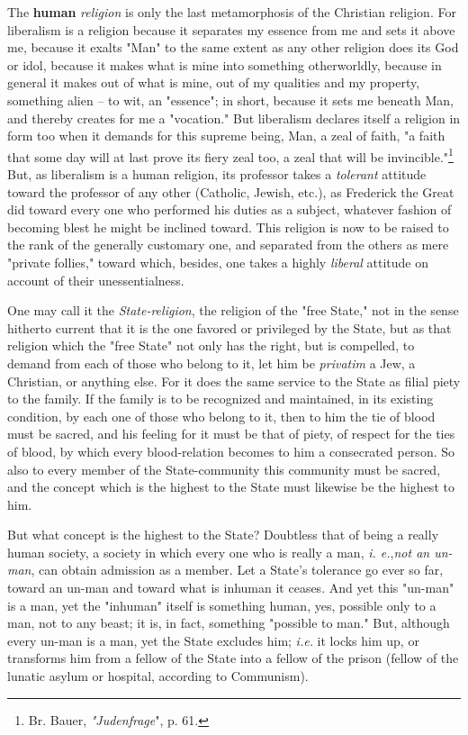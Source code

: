 The \textbf{human} \textit{religion} is only the last metamorphosis of the 
Christian religion. For liberalism is a religion because it separates my 
essence from me and sets it above me, because it exalts "{}Man"{} to the same 
extent as any other religion does its God or idol, because it makes what is 
mine into something otherworldly, because in general it makes out of what is 
mine, out of my qualities and my property, something alien -- to wit, an 
"{}essence"{}; in short, because it sets me beneath Man, and thereby creates 
for me a "{}vocation."{} But liberalism declares itself a religion in form too 
when it demands for this supreme being, Man, a zeal of faith, "{}a faith that 
some day will at last prove its fiery zeal too, a zeal that will be 
invincible."{}\footnote{Br. Bauer, \textit{"{}Judenfrage}"{}, p. 61.} But, as 
liberalism is a human religion, its professor takes a \textit{tolerant} 
attitude toward the professor of any other (Catholic, Jewish, etc.), as 
Frederick the Great did toward every one who performed his duties as a 
subject, whatever fashion of becoming blest he might be inclined toward. This 
religion is now to be raised to the rank of the generally customary one, and 
separated from the others as mere "{}private follies,"{} toward which, 
besides, one takes a highly \textit{liberal} attitude on account of their 
unessentialness.

One may call it the \textit{State-religion}, the religion of the "{}free 
State,"{} not in the sense hitherto current that it is the one favored or 
privileged by the State, but as that religion which the "{}free State"{} not 
only has the right, but is compelled, to demand from each of those who belong 
to it, let him be \textit{privatim} a Jew, a Christian, or anything else. For 
it does the same service to the State as filial piety to the family. If the 
family is to be recognized and maintained, in its existing condition, by each 
one of those who belong to it, then to him the tie of blood must be sacred, 
and his feeling for it must be that of piety, of respect for the ties of 
blood, by which every blood-relation becomes to him a consecrated person. So 
also to every member of the State-community this community must be sacred, and 
the concept which is the highest to the State must likewise be the highest to 
him.

But what concept is the highest to the State? Doubtless that of being a really 
human society, a society in which every one who is really a man, \textit{i. 
e.},\textit{not an un-man}, can obtain admission as a member. Let a State's 
tolerance go ever so far, toward an un-man and toward what is inhuman it 
ceases. And yet this "{}un-man"{} is a man, yet the "{}inhuman"{} itself is 
something human, yes, possible only to a man, not to any beast; it is, in 
fact, something "{}possible to man."{} But, although every un-man is a man, 
yet the State excludes him; \textit{i.e.} it locks him up, or transforms him 
from a fellow of the State into a fellow of the prison (fellow of the lunatic 
asylum or hospital, according to Communism).

